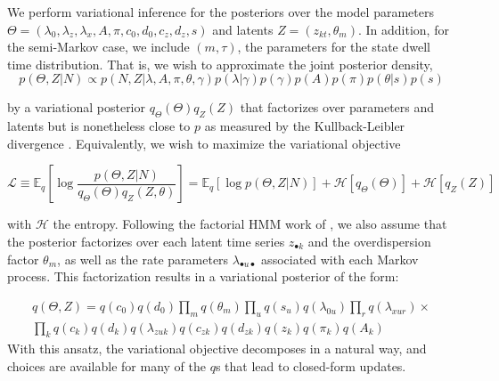 \documentclass{article} %
\begin{document}
We perform variational inference for the posteriors over the model parameters $\Theta = (\lambda_0, \lambda_z, \lambda_x, A, \pi, c_0, d_0, c_z, d_z, s)$ and latents $Z=(z_{kt},\theta_m)$. In addition, for the semi-Markov case, we include $(m, \tau)$, the parameters for the state dwell time distribution. That is, we wish to approximate the joint posterior density, 
\begin{equation}
    p(\Theta,Z|N) \propto p(N, Z |\lambda, A, \pi, \theta, \gamma) 
    p(\lambda|\gamma) p(\gamma)
    p(A)p(\pi)p(\theta|s)p(s)
\end{equation}

by a variational posterior $q_\Theta(\Theta)q_Z(Z)$ that factorizes over parameters and latents but is nonetheless close to $p$ as measured by the Kullback-Leibler divergence \cite{Wainwright2008-ii}. Equivalently, we wish to maximize the variational objective

\begin{equation}
    \mathcal{L} \equiv \mathbb{E}_q \left[\log \frac{p(\Theta,Z|N)}{q_\Theta(\Theta)q_Z(Z,\theta)} \right] = \mathbb{E}_q \left[\log p(\Theta,Z|N) \right] + \mathcal{H}[q_\Theta(\Theta)] + \mathcal{H}[q_Z(Z)]
\end{equation}

with $\mathcal{H}$ the entropy. Following the factorial HMM work of \cite{ghahramani1997factorial}, we also assume that the posterior factorizes over each latent time series $z_{\bullet k}$ and the overdispersion factor $\theta_m$, as well as the rate parameters $\lambda_{\bullet u \bullet}$ associated with each Markov process.  This factorization results in a variational posterior of the form:

\begin{multline}
    q(\Theta,Z) = q(c_0)q(d_0)\prod_m q(\theta_m) \prod_u q(s_u) q(\lambda_{0u}) \prod_r q(\lambda_{xur}) \times \\ 
    \prod_k q(c_k) q(d_k) 
    q(\lambda_{zuk}) q(c_{zk}) q(d_{zk}) q(z_k) q(\pi_k) q(A_k)
\end{multline}
With this ansatz, the variational objective decomposes in a natural way, and choices are available for many of the $q$s that lead to closed-form updates.
\end{document}
